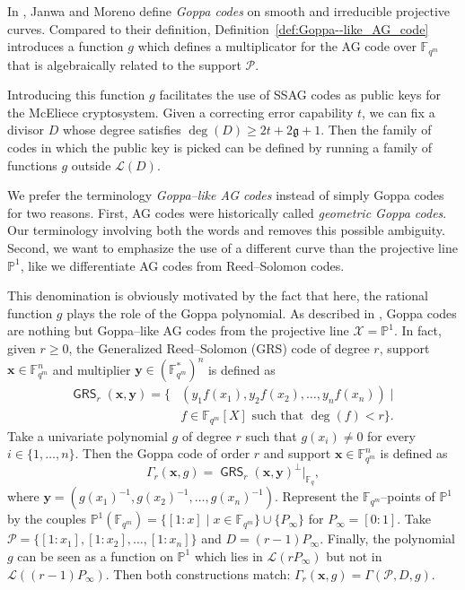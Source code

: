 \documentclass[peerreview]{IEEEtran}
\theoremstyle{plain}
\theoremstyle{definition}
\theoremstyle{remark}
\newcommand{\calP}{\mathcal{P}}
\newcommand{\calL}{\mathcal{L}}
\newcommand{\calX}{\mathcal{X}}
\newcommand{\fqm}{\mathbb{F}_{q^m}}
\newcommand{\fq}{\mathbb{F}_{q}}
\newcommand{\PP}{\mathbb{P}}
\newcommand{\GRS}{\operatorname{\mathsf{GRS}}}
\begin{document}
	In \cite{JM96}, Janwa and Moreno define \emph{Goppa codes} on smooth and irreducible projective curves. Compared to their definition, Definition~\ref{def:Goppa--like_AG_code} introduces a function $g$ which defines a multiplicator for the AG code over $\fqm$ that is algebraically related to the support $\calP$.
	
	
	Introducing this function $g$ facilitates the use of SSAG codes as public keys for the McEliece cryptosystem. Given a correcting error capability $t$, we can fix a divisor $D$ whose degree satisfies $\deg (D) \geq 2t + 2\mathfrak{g}+1$. Then the family of codes in which the public key is picked can be defined by running a family of functions $g$ outside $\calL(D)$.
	
	
	\medskip
	
	We prefer the terminology \emph{Goppa--like AG codes} instead of simply Goppa codes for two reasons. First, AG codes were historically called \textit{geometric Goppa codes}. Our terminology involving both the words  and  removes this possible ambiguity. Second, we want to emphasize the use of a different curve than the projective line $\PP^1$, like we differentiate AG codes from Reed--Solomon codes.
	
	This denomination is obviously motivated by the fact that here, the rational function $g$ plays the role of the Goppa polynomial. As described in \cite[Example~9.1.8]{Sti09}, Goppa codes are nothing but Goppa--like AG codes from the projective line $\calX=\PP^1$. In fact, given $r \geq 0$, the Generalized Reed--Solomon (GRS) code of degree $r$, support $\mathbf{x} \in \fqm^n$ and multiplier $\mathbf{y} \in (\fqm^*)^n$ is defined as
	\[\begin{aligned}
	\GRS_r(\mathbf{x},\mathbf{y})=\{&(y_1f(x_1),y_2f(x_2),\dots,y_nf(x_n)) \mid\\& f \in \fqm[X] \text{ such that } \deg (f) < r \}.
	\end{aligned}\]
	Take a univariate polynomial $g$ of degree $r$ such that $g(x_i) \neq 0$ for every  $i \in \{1,\dots,n\}$. Then the Goppa code of order $r$ and support $\mathbf{x} \in \fqm^n$ is defined as
	\begin{equation}\label{eq:classical_Goppa}
		\Gamma_r(\mathbf{x},g)= \GRS_r(\mathbf{x},\mathbf{y})^\perp|_{\fq},
	\end{equation}
	where $\mathbf{y}=(g(x_1)^{-1},g(x_2)^{-1},\dots,g(x_n)^{-1})$.
	Represent the $\fqm$--points of $\PP^1$ by the couples $\PP^1(\fqm)=\{[1:x] \mid x \in \fqm\} \cup \{P_\infty\}$ for $P_\infty=[0:1]$. Take $\calP=\{[1:x_1],[1:x_2],\dots,[1:x_n]\}$ and $D=(r-1)P_\infty$. Finally, the polynomial $g$ can be seen as a function on $\PP^1$ which lies in $\calL(rP_\infty)$ but not in $\calL((r-1)P_\infty)$. Then both constructions match: $\Gamma_r(\mathbf{x},g)=\Gamma(\calP,D,g)$.
	
\end{document}
